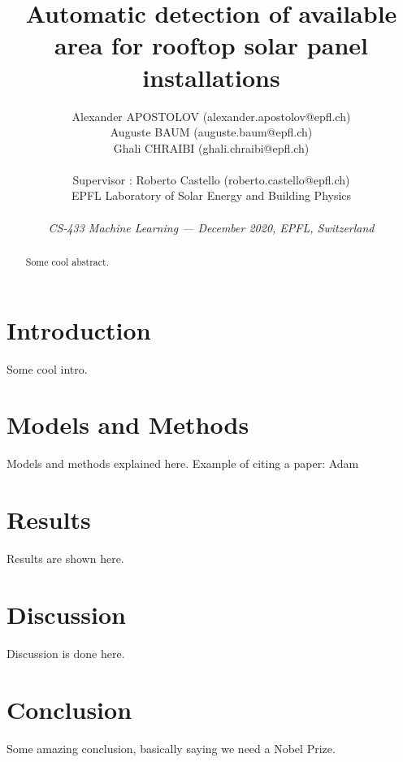 \documentclass[10pt,conference,compsocconf]{IEEEtran}
\begin{document}
\title{{\LARGE Automatic detection of available area for rooftop solar panel installations}\vspace{-3mm}}    

\author{
  Alexander APOSTOLOV (alexander.apostolov@epfl.ch)\\
  Auguste BAUM (auguste.baum@epfl.ch)\\
  Ghali CHRAIBI (ghali.chraibi@epfl.ch)\\
  \\
  Supervisor : Roberto Castello (roberto.castello@epfl.ch)\\ EPFL Laboratory of Solar Energy and Building Physics\\
  \\
  \textit{CS-433 Machine Learning --- December 2020, EPFL, Switzerland}
}
\maketitle

\begin{abstract}
  Some cool abstract.
\end{abstract}

\section{Introduction}
Some cool intro.

\section{Models and Methods}
Models and methods explained here.
Example of citing a paper: Adam~\citep{kingma2014adam}

\section{Results}
Results are shown here.

\section{Discussion}
Discussion is done here.

\section{Conclusion}
Some amazing conclusion, basically saying we need a Nobel Prize.




\end{document}
